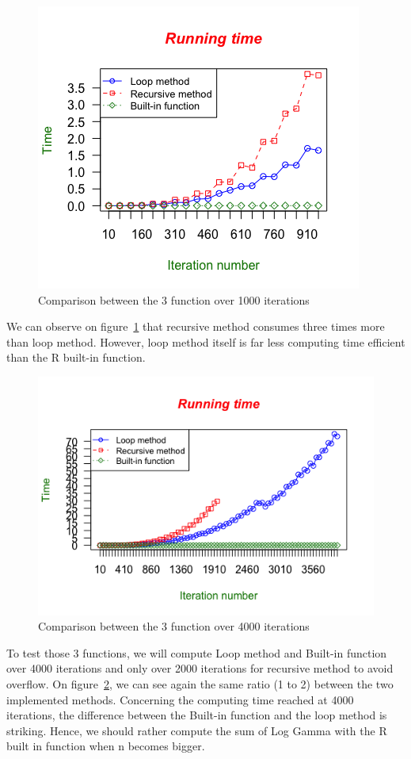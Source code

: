 \documentclass{article}
\begin{document}
\begin{figure}[!h]
\centering
\includegraphics[width=.8\textwidth]{Time_100_iterations.png}
 \caption{Comparison between the 3 function over 1000 iterations}
\label{courbe1}
\end{figure}

We can observe on figure~\ref{courbe1} that recursive method consumes three times more than loop method. However, loop method itself is far less computing time efficient than the R built-in function.

\begin{figure}[h!]
\centering
\includegraphics[width=.9\textwidth]{time_4000_iteration.png}
 \caption{Comparison between the 3 function over 4000 iterations}
\label{courbe2}
\end{figure}

To test those 3 functions, we will compute Loop method and Built-in function over 4000 iterations and only over 2000 iterations for recursive method to avoid overflow.
On figure~\ref{courbe2}, we can see again the same ratio (1 to 2) between the two implemented methods. Concerning the computing time reached at 4000 iterations, the difference between the Built-in function and the loop method is striking. Hence, we should rather compute the sum of Log Gamma with the R built in function when n becomes bigger.
\end{document}

